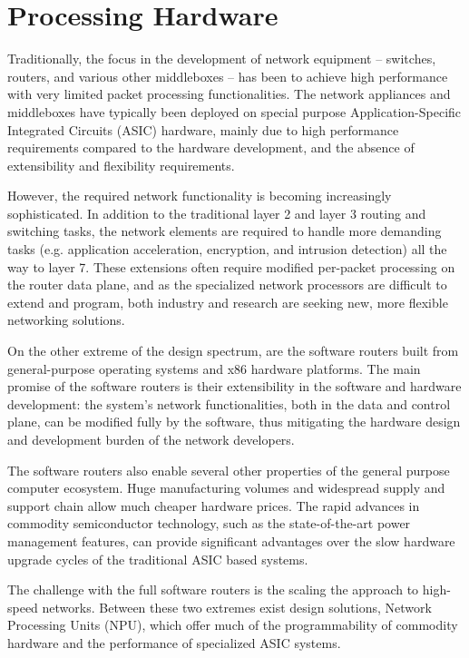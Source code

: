 \section{Processing Hardware}
\label{sec:hardware-architecture}

Traditionally, the focus in the development of network equipment -- switches, routers, and various other middleboxes -- has been to achieve high performance with very limited packet processing functionalities. The network appliances and middleboxes have typically been deployed on special purpose Application-Specific Integrated Circuits (ASIC) hardware, mainly due to high performance requirements compared to the hardware development, and the absence of extensibility and flexibility requirements.~\cite{Dobrescu:2009:REP}

However, the required network functionality is becoming increasingly sophisticated. In addition to the traditional layer 2 and layer 3 routing and switching tasks, the network elements are required to handle more demanding tasks (e.g. application acceleration, encryption, and intrusion detection) all the way to layer 7. These extensions often require modified per-packet processing on the router data plane, and as the specialized network processors are difficult to extend and program, both industry and research are seeking new, more flexible networking solutions.~\cite{Egi:2009:PP, Dobrescu:2009:REP}

On the other extreme of the design spectrum, are the software routers built from general-purpose operating systems and x86 hardware platforms. The main promise of the software routers is their extensibility in the software and hardware development: the system's network functionalities, both in the data and control plane, can be modified fully by the software, thus mitigating the hardware design and development burden of the network developers.~\cite{Dobrescu:2009:REP}

The software routers also enable several other properties of the general purpose computer ecosystem. Huge manufacturing volumes and widespread supply and support chain allow much cheaper hardware prices. The rapid advances in commodity semiconductor technology, such as the state-of-the-art power management features, can provide significant advantages over the slow hardware upgrade cycles of the traditional ASIC based systems.~\cite{Dobrescu:2009:REP}

The challenge with the full software routers is the scaling the approach to high-speed networks. Between these two extremes exist design solutions, Network Processing Units (NPU), which offer much of the programmability of commodity hardware and the performance of specialized ASIC systems.~\cite{Dobrescu:2009:REP}


